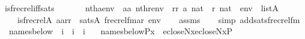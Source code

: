 \begin{isabellebody}
\isanewline
{}\isamarkupfalse%
\ is{\isacharunderscore}{\kern0pt}frecrel{\isacharunderscore}{\kern0pt}iff{\isacharunderscore}{\kern0pt}sats{\isacharcolon}{\kern0pt}\isanewline
\ \ \isanewline
\ \ \ \ {\isachardoublequoteopen}nth{\isacharparenleft}{\kern0pt}a{\isacharcomma}{\kern0pt}env{\isacharparenright}{\kern0pt}\ {\isacharequal}{\kern0pt}\ aa{\isachardoublequoteclose}\ {\isachardoublequoteopen}nth{\isacharparenleft}{\kern0pt}r{\isacharcomma}{\kern0pt}env{\isacharparenright}{\kern0pt}\ {\isacharequal}{\kern0pt}\ rr{\isachardoublequoteclose}\ {\isachardoublequoteopen}a{\isasymin}\ nat{\isachardoublequoteclose}\ \ {\isachardoublequoteopen}r{\isasymin}\ nat{\isachardoublequoteclose}\ \ {\isachardoublequoteopen}env\ {\isasymin}\ list{\isacharparenleft}{\kern0pt}A{\isacharparenright}{\kern0pt}{\isachardoublequoteclose}\isanewline
\ \ \isanewline
\ \ \ \ {\isachardoublequoteopen}is{\isacharunderscore}{\kern0pt}frecrel{\isacharparenleft}{\kern0pt}{\isacharhash}{\kern0pt}{\isacharhash}{\kern0pt}A{\isacharcomma}{\kern0pt}\ aa{\isacharcomma}{\kern0pt}rr{\isacharparenright}{\kern0pt}\ {\isasymlongleftrightarrow}\ sats{\isacharparenleft}{\kern0pt}A{\isacharcomma}{\kern0pt}\ frecrel{\isacharunderscore}{\kern0pt}fm{\isacharparenleft}{\kern0pt}a{\isacharcomma}{\kern0pt}r{\isacharparenright}{\kern0pt}{\isacharcomma}{\kern0pt}\ env{\isacharparenright}{\kern0pt}{\isachardoublequoteclose}\isanewline
%
\isadelimproof
\ \ %
\endisadelimproof
%
\isatagproof
{}\isamarkupfalse%
\ assms\isanewline
\ \ \isamarkupfalse%
\ {\isacharparenleft}{\kern0pt}simp\ add{\isacharcolon}{\kern0pt}sats{\isacharunderscore}{\kern0pt}frecrel{\isacharunderscore}{\kern0pt}fm{\isacharparenright}{\kern0pt}%
\endisatagproof
{\isafoldproof}%
%
\isadelimproof
\isanewline
%
\endisadelimproof
\isanewline
{}\isamarkupfalse%
\isanewline
\ \ names{\isacharunderscore}{\kern0pt}below\ {\isacharcolon}{\kern0pt}{\isacharcolon}{\kern0pt}\ {\isachardoublequoteopen}i\ {\isasymRightarrow}\ i\ {\isasymRightarrow}\ i{\isachardoublequoteclose}\ \isanewline
\ \ {\isachardoublequoteopen}names{\isacharunderscore}{\kern0pt}below{\isacharparenleft}{\kern0pt}P{\isacharcomma}{\kern0pt}x{\isacharparenright}{\kern0pt}\ {\isasymequiv}\ {}{\isasymtimes}ecloseN{\isacharparenleft}{\kern0pt}x{\isacharparenright}{\kern0pt}{\isasymtimes}ecloseN{\isacharparenleft}{\kern0pt}x{\isacharparenright}{\kern0pt}{\isasymtimes}P{\isachardoublequoteclose}\isanewline
\isanewline
{}\isamarkupfalse%

\end{isabellebody}
